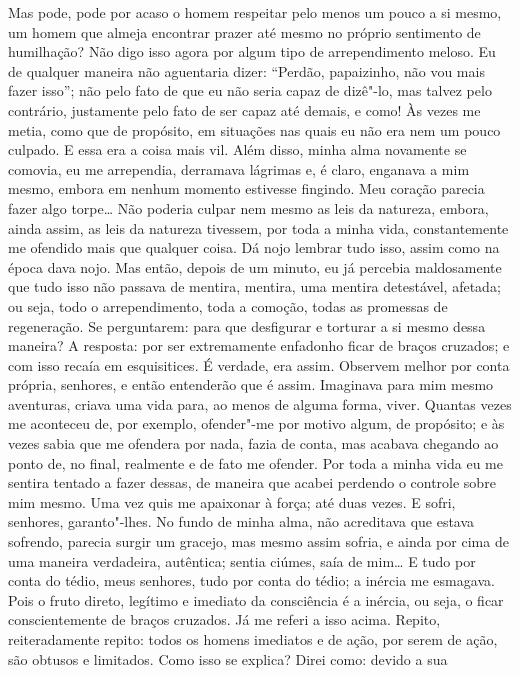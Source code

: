 Mas pode, pode por acaso o homem respeitar pelo menos um pouco a si
mesmo, um homem que almeja encontrar prazer até mesmo no próprio sentimento 
de humilhação? Não digo isso agora por algum tipo de
arrependimento meloso. Eu de qualquer maneira não aguentaria dizer:
``Perdão, papaizinho, não vou mais fazer isso''; não pelo fato de que eu
não seria capaz de dizê"-lo, mas talvez pelo contrário, justamente pelo
fato de ser capaz até demais, e como! Às vezes me metia, como que de
propósito, em situações nas quais eu não era nem um pouco culpado. E
essa era a coisa mais vil. Além disso, minha alma novamente se comovia,
eu me arrependia, derramava lágrimas e, é claro, enganava a mim mesmo,
embora em nenhum momento estivesse fingindo. Meu coração parecia fazer
algo torpe\ldots{} Não poderia culpar nem mesmo as leis da natureza, embora,
ainda assim, as leis da natureza tivessem, por toda a minha vida,
constantemente me ofendido mais que qualquer coisa. Dá nojo lembrar
tudo isso, assim como na época dava nojo. Mas então, depois de um
minuto, eu já percebia maldosamente que tudo isso não passava de
mentira, mentira, uma mentira detestável, afetada; ou seja, todo o
arrependimento, toda a comoção, todas as promessas de regeneração. Se
perguntarem: para que desfigurar e torturar a si mesmo dessa maneira? A
resposta: por ser extremamente enfadonho ficar de braços cruzados; e
com isso recaía em esquisitices. É verdade, era assim. Observem melhor
por conta própria, senhores, e então entenderão que é assim. Imaginava
para mim mesmo aventuras, criava uma vida para, ao menos de alguma
forma, viver. Quantas vezes me aconteceu de, por exemplo, ofender"-me
por motivo algum, de propósito; e às vezes sabia que me ofendera por
nada, fazia de conta, mas acabava chegando ao ponto de, no final,
realmente e de fato me ofender. Por toda a minha vida eu me sentira
tentado a fazer dessas, de maneira que acabei perdendo o controle sobre
mim mesmo. Uma vez quis me apaixonar à força; até duas vezes. E sofri,
senhores, garanto"-lhes. No fundo de minha alma, não acreditava que
estava sofrendo, parecia surgir um gracejo, mas mesmo assim sofria, e
ainda por cima de uma maneira verdadeira, autêntica; sentia ciúmes,
saía de mim\ldots{} E tudo por conta do tédio, meus senhores, tudo por conta
do tédio; a inércia me esmagava. Pois o fruto direto, legítimo e
imediato da consciência é a inércia, ou seja, o ficar conscientemente
de braços cruzados. Já me referi a isso acima. Repito, reiteradamente
repito: todos os homens imediatos e de ação, por serem de ação, são
obtusos e limitados. Como isso se explica? Direi como: devido a sua
